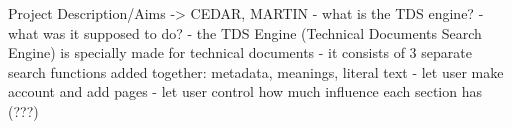 Project Description/Aims -> CEDAR, MARTIN
  - what is the TDS engine?
  - what was it supposed to do?
  - the TDS Engine (Technical Documents Search Engine) is specially made for technical documents
  - it consists of 3 separate search functions added together: metadata, meanings, literal text
  - let user make account and add pages
  - let user control how much influence each section has (???)
